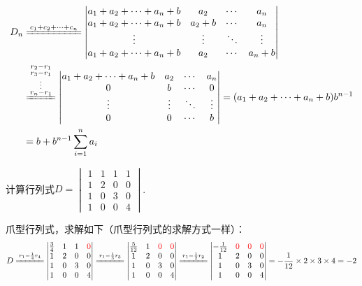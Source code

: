\documentclass[a4paper]{report}
\begin{document}
\begin{jie}
\begin{align*}
D_{n}&\xlongequal{c_1+c_2+\cdots+c_n}
\begin{vmatrix}
a_1+a_2+\cdots+a_{n}+b&a_2&\cdots&a_{n}\\
a_1+a_2+\cdots+a_{n}+b&a_2+b&\cdots&a_{n}\\
\vdots&\vdots&\ddots&\vdots\\
a_1+a_2+\cdots+a_{n}+b&a_2&\cdots&a_{n}+b
 \end{vmatrix}\\
&\xlongequal{\substack{r_2-r_1\\ r_3-r_1\\ \vdots\\ r_n-r_1}}
\begin{vmatrix}
a_1+a_2+\cdots+a_{n}+b&a_2&\cdots&a_{n}\\
0&b&\cdots&0\\
\vdots&\vdots&\ddots&\vdots\\
0&0&\cdots&b
 \end{vmatrix}=(a_1+a_2+\cdots+a_{n}+b)b^{n-1}\\
&=b+b^{n-1}\sum_{i=1}^{n}a_i
\end{align*}
\end{jie}

\EX 计算行列式$
D=
\begin{vmatrix}
1&1&1&1\\
1&2&0&0\\
1&0&3&0\\
1&0&0&4
\end{vmatrix}
$.

\begin{jie}
爪型行列式，求解如下（爪型行列式的求解方式一样）：
\begin{align*}
D\xlongequal{r_1-\frac{1}{4}r_4}
\begin{vmatrix}
\frac{3}{4}&1&1&\textcolor[rgb]{1.00,0.00,0.00}{0}\\
1&2&0&0\\
1&0&3&0\\
1&0&0&4
\end{vmatrix}\xlongequal{r_1-\frac{1}{3}r_3}
\begin{vmatrix}
\frac{5}{12}&1&\textcolor[rgb]{1.00,0.00,0.00}{0}&\textcolor[rgb]{1.00,0.00,0.00}{0}\\
1&2&0&0\\
1&0&3&0\\
1&0&0&4
\end{vmatrix}\xlongequal{r_1-\frac{1}{2}r_2}
\begin{vmatrix}
-\frac{1}{12}&\textcolor[rgb]{1.00,0.00,0.00}{0}&\textcolor[rgb]{1.00,0.00,0.00}{0}&\textcolor[rgb]{1.00,0.00,0.00}{0}\\
1&2&0&0\\
1&0&3&0\\
1&0&0&4
\end{vmatrix}=-\frac{1}{12}\times 2\times 3\times4=-2
\end{align*}
\end{jie}
\end{document}

